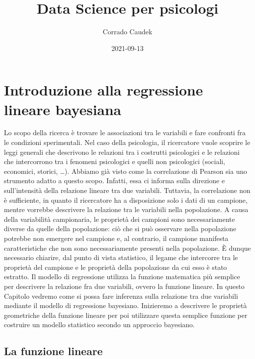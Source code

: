 \documentclass[
]{memoir}
\title{Data Science per psicologi}
\author{Corrado Caudek}
\date{2021-09-13}
\begin{document}
\maketitle

{
\hypersetup{linkcolor=}
\setcounter{tocdepth}{1}
\tableofcontents
}
\newpage

\vspace*{5cm}

\thispagestyle{empty}

\hypertarget{regr-models-intro}{%
\chapter{Introduzione alla regressione lineare bayesiana}\label{regr-models-intro}}

Lo scopo della ricerca è trovare le associazioni tra le variabili e fare
confronti fra le condizioni sperimentali. Nel caso della psicologia, il
ricercatore vuole scoprire le leggi generali che descrivono le relazioni
tra i costrutti psicologici e le relazioni che intercorrono tra i
fenomeni psicologici e quelli non psicologici (sociali, economici,
storici, \ldots). Abbiamo già visto come la correlazione di Pearson sia uno
strumento adatto a questo scopo. Infatti, essa ci informa sulla
direzione e sull'intensità della relazione lineare tra due variabili.
Tuttavia, la correlazione non è sufficiente, in quanto il ricercatore ha
a disposizione solo i dati di un campione, mentre vorrebbe descrivere la
relazione tra le variabili nella popolazione. A causa della variabilità
campionaria, le proprietà dei campioni sono necessariamente diverse da
quelle della popolazione: ciò che si può osservare nella popolazione
potrebbe non emergere nel campione e, al contrario, il campione
manifesta caratteristiche che non sono necessariamente presenti nella
popolazione. È dunque necessario chiarire, dal punto di vista
statistico, il legame che intercorre tra le proprietà del campione e le
proprietà della popolazione da cui esso è stato estratto.
Il modello di regressione utilizza la funzione matematica più semplice
per descrivere la relazione fra due variabili, ovvero la funzione
lineare. In questo Capitolo vedremo come si possa fare inferenza sulla relazione tra due variabili mediante il modello di regressione bayesiano. Inizieremo a descrivere le proprietà geometriche della funzione lineare per poi utilizzare questa semplice funzione per costruire un modello statistico secondo un approccio bayesiano.

\hypertarget{la-funzione-lineare}{%
\section{La funzione lineare}\label{la-funzione-lineare}}
\end{document}
